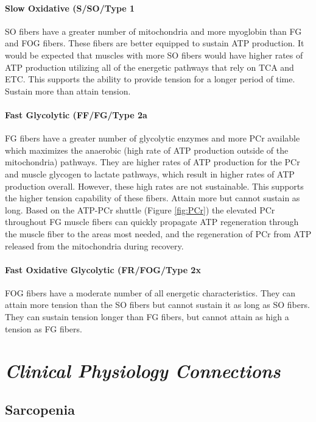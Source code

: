\paragraph{Slow Oxidative (S/SO/Type 1}

SO fibers have a greater number of mitochondria and more myoglobin than FG and FOG fibers. These fibers are better equipped to sustain ATP production. It would be expected that muscles with more SO fibers would have higher rates of ATP production utilizing all of the energetic pathways that rely on TCA and ETC. This supports the ability to provide tension for a longer period of time. Sustain more than attain tension.

\paragraph{Fast Glycolytic (FF/FG/Type 2a}

FG fibers have a greater number of glycolytic enzymes and more PCr available which maximizes the anaerobic (high rate of ATP production outside of the mitochondria) pathways. They are higher rates of ATP production for the PCr and muscle glycogen to lactate pathways, which result in higher rates of ATP production overall. However, these high rates are not sustainable. This supports the higher tension capability of these fibers. Attain more but cannot sustain as long. Based on the ATP-PCr shuttle (Figure \ref{fig:PCr}) the elevated PCr throughout FG muscle fibers can quickly propagate ATP regeneration through the muscle fiber to the areas most needed, and the regeneration of PCr from ATP released from the mitochondria during recovery.

\paragraph{Fast Oxidative Glycolytic (FR/FOG/Type 2x}

FOG fibers have a moderate number of all energetic characteristics. They can attain more tension than the SO fibers but cannot sustain it as long as SO fibers. They can sustain tension longer than FG fibers, but cannot attain as high a tension as FG fibers. 

\section{\textit{Clinical Physiology Connections}}

\subsection{Sarcopenia}

